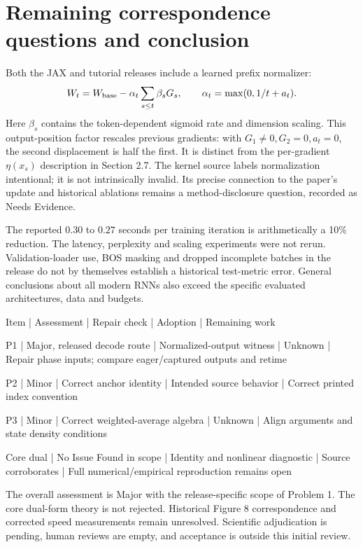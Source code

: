 \documentclass[10pt]{article}
\begin{document}
\section*{Remaining correspondence questions and conclusion}
Both the JAX and tutorial releases include a learned prefix normalizer: \[W_t=W_{\rm base}-\alpha_t\sum_{s\le t}\beta_sG_s,\qquad
 \alpha_t=\max(0,1/t+a_t).\] Here \(\beta_s\) contains the token-dependent sigmoid rate and dimension scaling. This output-position factor rescales previous gradients: with \(G_1\ne0,G_2=0,a_t=0\), the second displacement is half the first. It is distinct from the per-gradient \(\eta(x_s)\) description in Section 2.7. The kernel source labels normalization intentional; it is not intrinsically invalid. Its precise connection to the paper’s update and historical ablations remains a method-disclosure question, recorded as Needs Evidence.\par
The reported \(0.30\) to \(0.27\) seconds per training iteration is arithmetically a 10\% reduction. The latency, perplexity and scaling experiments were not rerun. Validation-loader use, BOS masking and dropped incomplete batches in the release do not by themselves establish a historical test-metric error. General conclusions about all modern RNNs also exceed the specific evaluated architectures, data and budgets.\par
Item | Assessment | Repair check | Adoption | Remaining work\par
P1 | Major, released decode route | Normalized-output witness | Unknown | Repair phase inputs; compare eager/captured outputs and retime\par
P2 | Minor | Correct anchor identity | Intended source behavior | Correct printed index convention\par
P3 | Minor | Correct weighted-average algebra | Unknown | Align arguments and state density conditions\par
Core dual | No Issue Found in scope | Identity and nonlinear diagnostic | Source corroborates | Full numerical/empirical reproduction remains open\par
The overall assessment is Major with the release-specific scope of Problem 1. The core dual-form theory is not rejected. Historical Figure 8 correspondence and corrected speed measurements remain unresolved. Scientific adjudication is pending, human reviews are empty, and acceptance is outside this initial review.\par
\end{document}
